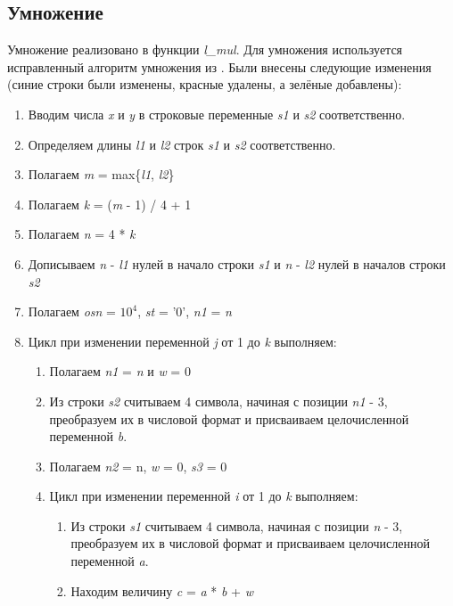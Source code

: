 \subsection{Умножение}
Умножение реализовано в функции \textit{l\_mul}. Для умножения используется исправленный алгоритм умножения из \cite{zavg}.
Были внесены следующие изменения (синие строки были изменены, красные удалены, а зелёные добавлены):
\begin{enumerate}
    \item Вводим числа \textit{x} и \textit{y} в строковые переменные \textit{s1} и \textit{s2} соответственно.
    \item Определяем длины \textit{l1} и \textit{l2} строк \textit{s1} и \textit{s2} соответственно.
    \item Полагаем \textit{m} = max\{\textit{l1}, \textit{l2}\}
    \color{blue}
    \item Полагаем \textit{k} = (\textit{m} - 1) / 4 + 1
    \color{black}
    \item Полагаем \textit{n} = 4 * \textit{k}
    \item Дописываем \textit{n} - \textit{l1} нулей в начало строки \textit{s1} и \textit{n} - \textit{l2} нулей в началов строки \textit{s2}
    \color{blue}
    \item Полагаем \textit{osn} = $10^4$, \textit{st} = '0', \textit{n1} = \textit{n}
    \color{black}
    \item Цикл при изменении переменной \textit{j} от 1 до \textit{k} выполняем:
    \begin{enumerate}
        \color{red}
        \item Полагаем \textit{n1} = \textit{n} и \textit{w} = 0
        \color{black}
        \item Из строки \textit{s2} считываем 4 символа, начиная с позиции \textit{n1} - 3, преобразуем их в числовой формат и присваиваем целочисленной переменной \textit{b}.
        \color{green}
        \item Полагаем \textit{n2} = n, \textit{w} = 0, \textit{s3} = 0
        \color{black}
        \item Цикл при изменении переменной \textit{i} от 1 до \textit{k} выполняем:
        \begin{enumerate}
            \item Из строки \textit{s1} считываем 4 символа, начиная с позиции \textit{n} - 3, преобразуем их в числовой формат и присваиваем целочисленной переменной \textit{a}.
            \item Находим величину \textit{c} = \textit{a} * \textit{b} + \textit{w}

\end{enumerate}
\end{enumerate}
\end{enumerate}
